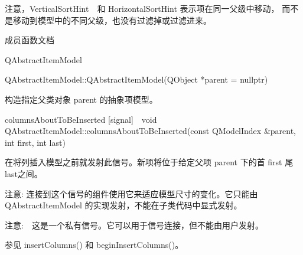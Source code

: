 注意，VerticalSortHint　和 HorizontalSortHint 表示项在同一父级中移动，
而不是移动到模型中的不同父级，也没有过滤掉或过滤进来。

\splitLine

成员函数文档

QAbstractItemModel

QAbstractItemModel::QAbstractItemModel(QObject *parent = nullptr)

构造指定父类对象 parent 的抽象项模型。

columnsAboutToBeInserted
[signal] void QAbstractItemModel::columnsAboutToBeInserted(const QModelIndex \&parent, int first, int last)

在将列插入模型之前就发射此信号。新项将位于给定父项 parent 下的首 first 尾 last之间。

注意: 连接到这个信号的组件使用它来适应模型尺寸的变化。它只能由 QAbstractItemModel 的实现发射，不能在子类代码中显式发射。

注意:　这是一个私有信号。它可以用于信号连接，但不能由用户发射。

参见 insertColumns() 和 beginInsertColumns()。
